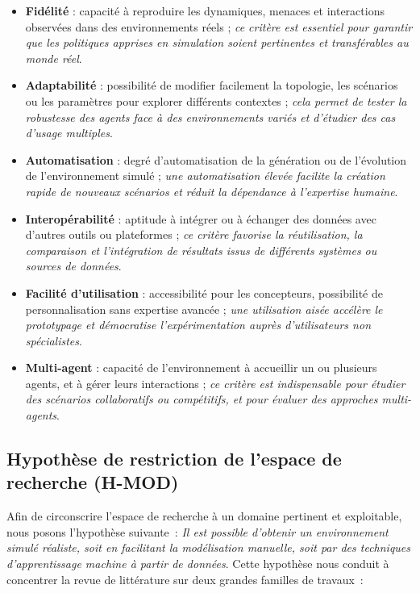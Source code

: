 \begin{itemize}
    \item \textbf{Fidélité} : capacité à reproduire les dynamiques, menaces et interactions observées dans des environnements réels ; \emph{ce critère est essentiel pour garantir que les politiques apprises en simulation soient pertinentes et transférables au monde réel}.
    \item \textbf{Adaptabilité} : possibilité de modifier facilement la topologie, les scénarios ou les paramètres pour explorer différents contextes ; \emph{cela permet de tester la robustesse des agents face à des environnements variés et d’étudier des cas d’usage multiples}.
    \item \textbf{Automatisation} : degré d’automatisation de la génération ou de l’évolution de l’environnement simulé ; \emph{une automatisation élevée facilite la création rapide de nouveaux scénarios et réduit la dépendance à l’expertise humaine}.
    \item \textbf{Interopérabilité} : aptitude à intégrer ou à échanger des données avec d’autres outils ou plateformes ; \emph{ce critère favorise la réutilisation, la comparaison et l’intégration de résultats issus de différents systèmes ou sources de données}.
    \item \textbf{Facilité d’utilisation} : accessibilité pour les concepteurs, possibilité de personnalisation sans expertise avancée ; \emph{une utilisation aisée accélère le prototypage et démocratise l’expérimentation auprès d’utilisateurs non spécialistes}.
    \item \textbf{Multi-agent} : capacité de l’environnement à accueillir un ou plusieurs agents, et à gérer leurs interactions ; \emph{ce critère est indispensable pour étudier des scénarios collaboratifs ou compétitifs, et pour évaluer des approches multi-agents}.
\end{itemize}

\subsection*{Hypothèse de restriction de l’espace de recherche (\textbf{H-MOD})}

Afin de circonscrire l’espace de recherche à un domaine pertinent et exploitable, nous posons l’hypothèse suivante~: \textit{Il est possible d’obtenir un environnement simulé réaliste, soit en facilitant la modélisation manuelle, soit par des techniques d’apprentissage machine à partir de données}. Cette hypothèse nous conduit à concentrer la revue de littérature sur deux grandes familles de travaux~:

